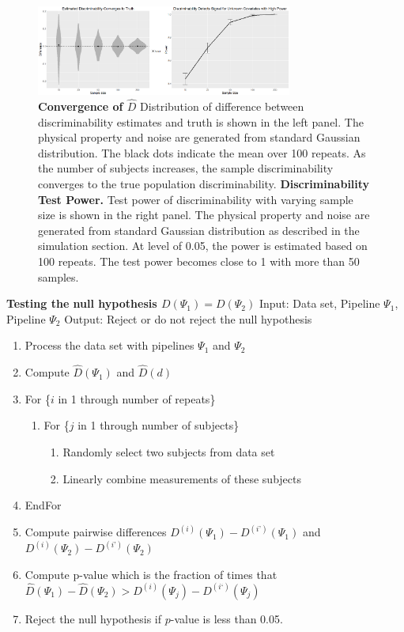 \documentclass[simplex.tex]{subfiles}
\begin{document}
\begin{figure}[h!]
\begin{cframed}
\centering
\includegraphics[width=0.75\textwidth]{./figs/discriminability1.png}
\caption{
{\bf Convergence of $\hat D$}
Distribution of difference between
discriminability estimates and truth is
shown in the left panel. The physical
property and noise are generated from
standard Gaussian distribution. The black
dots indicate the mean over 100 repeats. As
the number of subjects increases, the
sample discriminability converges to the
true population discriminability.  {\bf
Discriminability Test Power.} Test power
of discriminability with varying sample
size is shown in the right panel. The
physical property and noise are generated
from standard Gaussian distribution as
described in the simulation section. At
level of 0.05, the power is estimated based
on  100 repeats. The test power becomes close
to 1 with more than 50 samples.}
\label{fig:dis1}
\end{cframed}
\end{figure}

{\bf Testing the null hypothesis $D(\Psi_1) = D(\Psi_2)$}
Input: Data set, Pipeline $\Psi_1$, Pipeline $\Psi_2$
Output: Reject or do not reject the null hypothesis


\begin{enumerate}
\item Process the data set with pipelines $\Psi_1$ and $\Psi_2$
\item Compute $\hat D(\Psi_1)$ and $\hat D(d)$  
\item For \{$i$ in 1 through number of repeats\} 
  \begin{enumerate}
  \item For \{$j$ in 1 through number of subjects\} 
    \begin{enumerate}
    \item Randomly select two subjects from data set 
    \item Linearly combine measurements of these subjects
    \end{enumerate}
  \end{enumerate}
\item EndFor
\item Compute pairwise differences $D^{(i)}(\Psi_1) - D^{(i’)}(\Psi_1)$ and $D^{(i)}(\Psi_2) - D^{(i’)}(\Psi_2)$
\item Compute p-value which is the fraction of times that $\hat D(\Psi_1)−\hat D(\Psi_2) > D^{(i)}(\Psi_j) − D^{(i‘)}(\Psi_j)$
\item Reject the null hypothesis if $p$-value is less than 0.05.
\end{enumerate}
\end{document}
